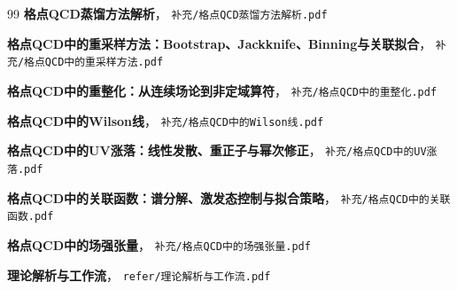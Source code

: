 \documentclass[12pt,a4paper]{ctexart}
\theoremstyle{definition}
\begin{document}
\begin{thebibliography}{99}
\textbf{格点QCD蒸馏方法解析}，
\texttt{补充/格点QCD蒸馏方法解析.pdf}

\textbf{格点QCD中的重采样方法：Bootstrap、Jackknife、Binning与关联拟合}，
\texttt{补充/格点QCD中的重采样方法.pdf}

\textbf{格点QCD中的重整化：从连续场论到非定域算符}，
\texttt{补充/格点QCD中的重整化.pdf}

\textbf{格点QCD中的Wilson线}，
\texttt{补充/格点QCD中的Wilson线.pdf}

\textbf{格点QCD中的UV涨落：线性发散、重正子与幂次修正}，
\texttt{补充/格点QCD中的UV涨落.pdf}

\textbf{格点QCD中的关联函数：谱分解、激发态控制与拟合策略}，
\texttt{补充/格点QCD中的关联函数.pdf}

\textbf{格点QCD中的场强张量}，
\texttt{补充/格点QCD中的场强张量.pdf}

\textbf{理论解析与工作流}，
\texttt{refer/理论解析与工作流.pdf}

\end{thebibliography}
\end{document}
